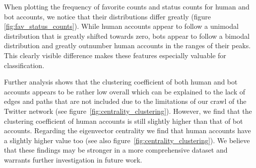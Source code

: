 When plotting the frequency of favorite counts and status counts for human and bot accounts, we notice that their distributions differ greatly (figure \ref{fig:fav_status_counts}). While human accounts appear to follow a unimodal distribution that is greatly shifted towards zero, bots appear to follow a bimodal distribution and greatly outnumber human accounts in the ranges of their peaks. This clearly visible difference makes these features especially valuable for classification.

Further analysis shows that the clustering coefficient of both human and bot accounts appears to be rather low overall which can be explained to the lack of edges and paths that are not included due to the limitations of our crawl of the Twitter network (see figure~\ref{fig:centrality_clustering}). However, we find that the clustering coefficient of human accounts is still slightly higher than that of bot accounts. Regarding the eigenvector centrality we find that human accounts have a slightly higher value too (see also figure~\ref{fig:centrality_clustering}). We believe that these findings may be stronger in a more comprehensive dataset and warrants further investigation in future work.

